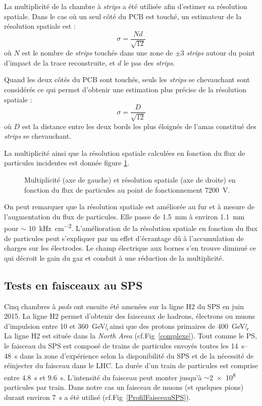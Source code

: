 La multiplicité de la chambre à \textit{strips} a été utilisée afin d'estimer sa résolution spatiale. Dans le cas où un seul côté du PCB est touché, un estimateur de la résolution spatiale est :
\begin{equation}
\sigma=\frac{Nd}{\sqrt{12}}
\end{equation}
où $N$ est le nombre de \textit{strips} touchés dans une zone de $\pm$\num{3} \textit{strips} autour du point d’impact de la trace reconstruite, et $d$ le pas des \textit{strips}.

Quand les deux côtés du PCB sont touchés, seuls les \textit{strips} se chevauchant sont considérés ce qui permet d'obtenir une estimation plus précise de la résolution spatiale :
\begin{equation}
\sigma=\frac{D}{\sqrt{12}}
\end{equation} 
où $D$ est la distance entre les deux bords les plus éloignés de l'amas constitué des \textit{strips} se chevauchant.

La multiplicité ainsi que la résolution spatiale calculées en fonction du flux de particules incidentes est donnée figure \ref{ResoSpatialPS}. 

\begin{figure}[!ht]
	\centering
	\caption{Multiplicité (axe de gauche) et résolution spatiale (axe de droite) en fonction du flux de particules au point de fonctionnement \SI{7200}{\volt}.}
	\label{ResoSpatialPS}
\end{figure}

On peut remarquer que la résolution spatiale est améliorée au fur et à mesure de l'augmentation du flux de particules. Elle passe de \SI{1.5}{\milli\meter} à environ \SI{1.1}{\milli\meter} pour $\sim$ \SI{10}{\kilo\hertz\per\square\centi\meter}. L'amélioration de la résolution spatiale en fonction du flux de particules peut s'expliquer par un effet d'écrantage dû à l'accumulation de charges sur les électrodes. Le champ électrique aux bornes s'en trouve diminué ce qui décroit le gain du gaz et conduit à une réduction de la multiplicité.

\subsection{Tests en faisceaux au SPS} 
\label{SPSS}
Cinq chambres à \textit{pads} ont ensuite été amenées sur la ligne H2 \cite{H2line} du SPS en juin \num{2015}. La ligne H2 permet d'obtenir des faisceaux de hadrons, électrons ou muons d'impulsion entre \num{10} et \SI{360}{\giga\eV/\c} ainsi que des protons primaires de \SI{400}{\giga\eV/\c}. La ligne H2 est située dans la \textit{North Area} (cf.Fig~\ref{complexe}). Tout comme le PS, le faisceau du SPS est composé de trains de particules envoyés toutes les \SIrange{14}{48}{\second} dans la zone d’expérience selon la disponibilité du SPS et de la nécessité de réinjecter du faisceau dans le LHC. La durée d’un train de particules est comprise entre \SI{4.8}{\second} et \SI{9.6}{\second}. L'intensité du faisceau peut monter jusqu'à $\sim$\num{2e8} particules par train. Dans notre cas un faisceau de muons (et quelques pions) durant environ \SI{7}{\second} a été utilisé (cf.Fig~\ref{ProfilFaisceauSPS}).

